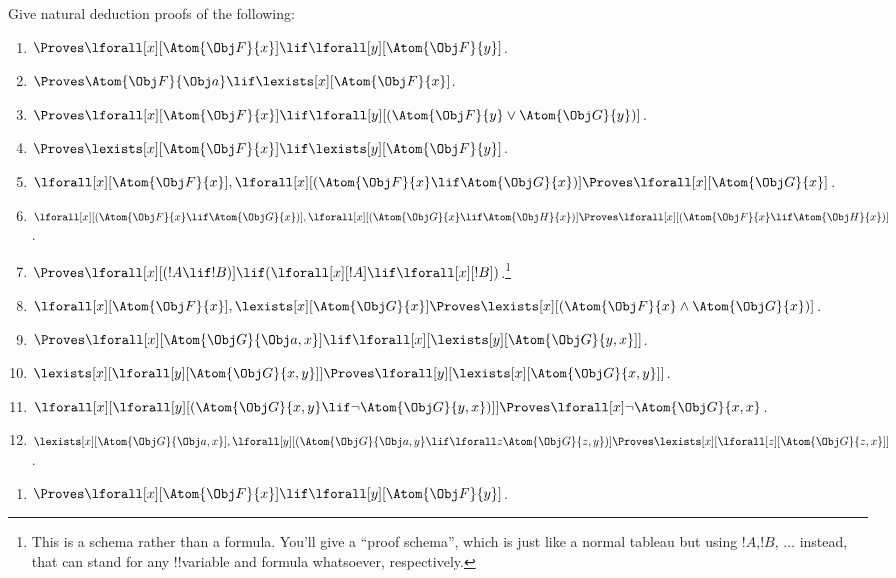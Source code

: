 \documentclass[../../../../include/open-logic-section]{subfiles}
\begin{document}


\begin{prob}
Give natural deduction proofs of the following:
\begin{enumerate}
\item $\Proves\lforall[x][\Atom{\Obj F}{x}]\lif\lforall[y][\Atom{\Obj F}{y}]$.
\item $\Proves \Atom{\Obj F}{\Obj a}\lif\lexists[x][\Atom{\Obj F}{x}]$.
\item $\Proves\lforall[x][\Atom{\Obj F}{x}]\lif\lforall[y][(\Atom{\Obj F}{y}\lor \Atom{\Obj G}{y})]$.
\item $\Proves\lexists[x][\Atom{\Obj F}{x}]\lif\lexists[y][\Atom{\Obj F}{y}]$.
\item $\lforall[x][\Atom{\Obj F}{x}],\lforall[x][(\Atom{\Obj F}{x}\lif \Atom{\Obj G}{x})]
    \Proves\lforall[x][\Atom{\Obj G}{x}]$.
\item $\lforall[x][(\Atom{\Obj F}{x}\lif \Atom{\Obj G}{x})],\lforall[x][(\Atom{\Obj G}{x}\lif \Atom{\Obj H}{x})]
\Proves\lforall[x][(\Atom{\Obj F}{x}\lif \Atom{\Obj H}{x})]$.
\item $\Proves\lforall[x][(!A \lif !B)]\lif(\lforall[x][!A]\lif\lforall[x][!B])$.\footnote{This is a schema rather than a formula. You'll give a ``proof schema'', which is just like a normal tableau but using
$!A$,$!B$, $\ldots$ instead, that can stand for any !!{variable} and formula whatsoever, respectively.}
\item $\lforall[x][\Atom{\Obj F}{x}],\lexists[x][\Atom{\Obj G}{x}]
    \Proves\lexists[x][(\Atom{\Obj F}{x}\land \Atom{\Obj G}{x})]$.
\item $\Proves\lforall[x][\Atom{\Obj G}{{\Obj a},x}]\lif\lforall[x][\lexists[y][\Atom{\Obj G}{y,x}]]$.
\item $\lexists[x][\lforall[y][\Atom{\Obj G}{x,y}]]\Proves\lforall[y][\lexists[x][\Atom{\Obj G}{x,y}]]$.
\item $\lforall[x][\lforall[y][(\Atom{\Obj G}{x,y}\lif\lnot \Atom{\Obj G}{y,x})]]
    \Proves\lforall[x]\lnot \Atom{\Obj G}{x,x}$.
\item $\lexists[x][\Atom{\Obj G}{\Obj a,x}],\lforall[y][(\Atom{\Obj G}{\Obj a,y}\lif\lforall z\Atom{\Obj G}{z,y})]
\Proves\lexists[x][\lforall[z][\Atom{\Obj G}{z,x}]]$.
\end{enumerate}
\begin{ans}
\begin{enumerate}
    \item $\Proves\lforall[x][\Atom{\Obj F}{x}]\lif\lforall[y][\Atom{\Obj F}{y}]$.
    

\end{enumerate}
\end{ans}
\end{prob}
\end{document}
